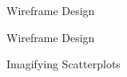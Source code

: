 \documentclass[a4paper,11pt,titlepage]{article}
\begin{document}
	\begin{figure}[H]
    			\caption{Wireframe Design}%
	\end{figure}	
		
	\begin{figure}[H]
    			\caption{Wireframe Design}%
	\end{figure}	
	
	\begin{figure}[H]
    			\caption{Imagifying Scatterplots}%
	\end{figure}	
	
\end{document}
